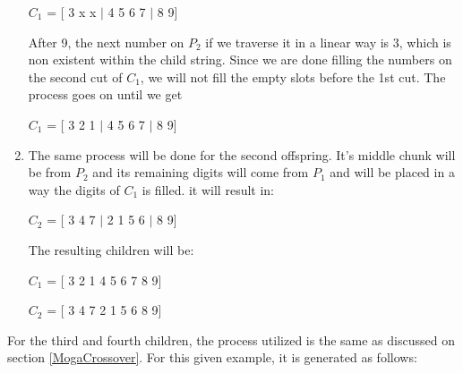 \begin{enumerate}
	\hfill \par 
	$C_{1}$ = [ 3 x x $|$ 4 5 6 7 $|$ 8 9] \par 
	\hfill \par
	After 9, the next number on $P_2$ if we traverse it in a linear way is 3, which is non existent within the child string. Since we are done filling the numbers on the second cut of $C_1$, we will not fill the empty slots before the 1st cut. The process goes on until we get \par 
	\hfill \par 
	$C_{1}$ = [ 3 2 1 $|$ 4 5 6 7 $|$ 8 9] \par 
	\hfill \par 
	
	\item The same process will be done for the second offspring. It's middle chunk will be from $P_2$ and its remaining digits will come from $P_1$ and will be placed in a way the digits of $C_1$ is filled. it will result in:
	\hfill \par 
	$C_{2}$ = [ 3 4 7 $|$ 2 1 5 6 $|$ 8 9] \par
	
	\hfill \par 
	
	The resulting children will be:
	\hfill \par
	$C_{1}$ = [ 3 2 1 4 5 6 7 8 9] \par 
	$C_{2}$ = [ 3 4 7 2 1 5 6 8 9] \par 
	\hfill \par 
	
\end{enumerate}

For the third and fourth children, the process utilized is the same as discussed on section \ref{MogaCrossover}. For this given example, it is generated as follows:

